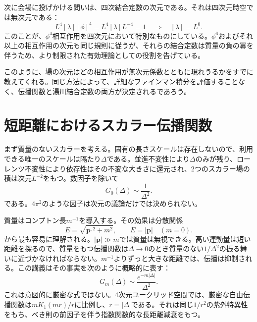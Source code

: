 次に会場に投げかける問いは、四次結合定数の次元である。それは四次元時空では無次元である：
\begin{equation}
L^4[\lambda][\phi]^4=L^4[\lambda]L^{-4}=1
\quad\Longrightarrow\quad [\lambda]=L^0.
\end{equation}
このことが、\(\phi^4\)相互作用を四次元において特別なものにしている。\(\phi^6\)およびそれ以上の相互作用の次元も同じ規則に従うが、それらの結合定数は質量の負の冪を伴うため、より制限された有効理論としての役割を告げている。

このように、場の次元はどの相互作用が無次元係数とともに現れうるかをすでに教えてくれる。同じ方法によって、詳細なファインマン積分を評価することなく、伝播関数と湯川結合定数の両方が決定されるであろう。

\section{短距離におけるスカラー伝播関数}

まず質量のないスカラーを考える。固有の長さスケールは存在しないので、利用できる唯一のスケールは隔たり\(\Delta\)である。並進不変性により\(\Delta\)のみが残り、ローレンツ不変性により依存性はその不変な大きさに還元され、2つのスカラー場の積は次元\(L^{-2}\)をもつ。数因子を除いて
\begin{equation}
G_0(\Delta)\sim\frac{1}{\Delta^2}.
\end{equation}
である。\(4\pi^2\)のような因子は次元の議論だけでは決められない。

質量はコンプトン長\(m^{-1}\)を導入する。その効果は分散関係
\begin{equation}
E=\sqrt{\bm p^{,2}+m^2},
\qquad
E=|\bm p|\quad(m=0).
\end{equation}
から最も容易に理解される。\(|\bm p|\gg m\)では質量は無視できる。高い運動量は短い距離を探るので、質量をもつ伝播関数は\(\Delta\to0\)のとき質量のない\(1/\Delta^2\)の振る舞いに近づかなければならない。\(m^{-1}\)よりずっと大きな距離では、伝播は抑制される。この講義はその事実を次のように概略的に表す：
\begin{equation}
G_m(\Delta)\sim \frac{e^{-m|\Delta|}}{\Delta^2}.
\end{equation}
これは意図的に厳密な式ではない。4次元ユークリッド空間では、厳密な自由伝播関数は\(mK_1(mr)/r\)に比例し、\(r=|\Delta|\)である。それは同じ\(1/r^2\)の紫外特異性をもち、べき則の前因子を伴う指数関数的な長距離減衰をもつ。


